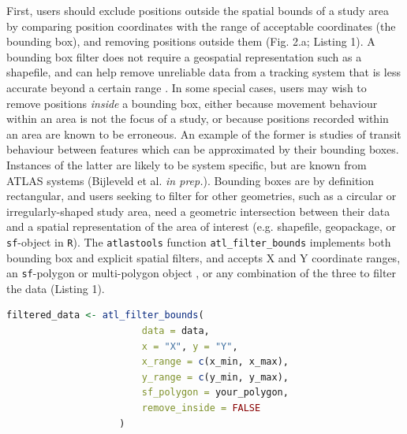 \documentclass[10pt,paper=a4,headings=standardclasses
]{scrartcl}
\begin{document}
First, users should exclude positions outside the spatial bounds of a study area by comparing position coordinates with the range of acceptable coordinates (the bounding box), and removing positions outside them (Fig. 2.a; Listing 1). 
A bounding box filter does not require a geospatial representation such as a shapefile, and can help remove unreliable data from a tracking system that is less accurate beyond a certain range \citep[e.g. in ATLAS systems][]{beardsworth2021}.
In some special cases, users may wish to remove positions \textit{inside} a bounding box, either because movement behaviour within an area is not the focus of a study, or because positions recorded within an area are known to be erroneous.
An example of the former is studies of transit behaviour between features which can be approximated by their bounding boxes. 
Instances of the latter are likely to be system specific, but are known from ATLAS systems (Bijleveld et al. \textit{in prep.}). 
Bounding boxes are by definition rectangular, and users seeking to filter for other geometries, such as a circular or irregularly-shaped study area, need a geometric intersection between their data and a spatial representation of the area of interest (e.g. shapefile, geopackage, or \texttt{sf}-object in \texttt{R}).
The \texttt{atlastools} function \texttt{atl\_filter\_bounds} implements both bounding box and explicit spatial filters, and accepts X and Y coordinate ranges, an \texttt{sf}-polygon or multi-polygon object \citep{pebesma2018}, or any combination of the three to filter the data (Listing 1).

\begin{lstlisting}[float,floatplacement=h!,language=R, style=customR, caption = {
    The \texttt{atl\_filter\_bounds} function filters on an area defined by coordinate ranges, a polygon, or all three; it can remove positions outside (\texttt{remove\_inside = FALSE}), or within the area (\texttt{remove\_inside = TRUE}).
    The arguments \texttt{x} and \texttt{y} determine the X and Y coordinate columns, \texttt{x\_range} and \texttt{y\_range} are the filter bounds in a coordinate reference system in metres, and the data can be filtered by an \texttt{sf-(MULTI)POLYGON} can be passed using the \texttt{sf\_polygon} argument. 
    The output is a \texttt{data.table}, which must be saved as an object (here, \texttt{filtered\_data}).}]
filtered_data <- atl_filter_bounds(
                        data = data,
                        x = "X", y = "Y",
                        x_range = c(x_min, x_max),
                        y_range = c(y_min, y_max),
                        sf_polygon = your_polygon,
                        remove_inside = FALSE
                    )
\end{lstlisting}
\end{document}
